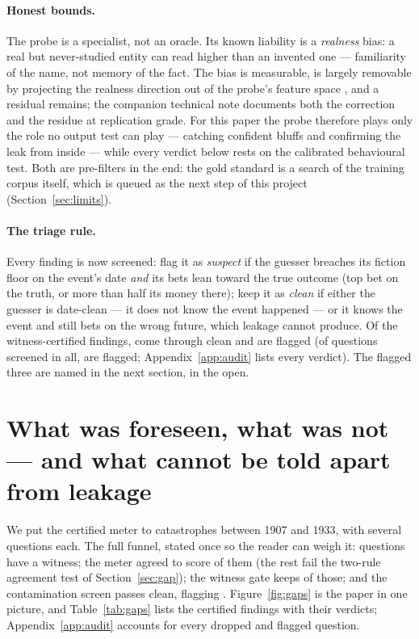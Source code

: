 \documentclass[11pt]{article}
\begin{document}
\paragraph{Honest bounds.} The probe is a specialist, not an oracle. Its known liability is a
\emph{realness} bias: a real but never-studied entity can read higher than an invented one --- familiarity
of the name, not memory of the fact. The bias is measurable, is largely removable by projecting the
realness direction out of the probe's feature space \citep{ravfogel2020}, and a residual remains; the
companion technical note documents both the correction and the residue at replication grade. For this
paper the probe therefore plays only the role no output test can play --- catching confident bluffs and
confirming the leak from inside --- while every verdict below rests on the calibrated behavioural test.
Both are pre-filters in the end: the gold standard is a search of the training corpus itself, which is
queued as the next step of this project (Section~\ref{sec:limits}).

\paragraph{The triage rule.} Every finding is now screened: flag it as \emph{suspect} if the guesser
breaches its fiction floor on the event's date \emph{and} its bets lean toward the true outcome (top bet
on the truth, or more than half its money there); keep it as \emph{clean} if either the guesser is
date-clean --- it does not know the event happened --- or it knows the event and still bets on the wrong
future, which leakage cannot produce. Of the \NgatePassed{} witness-certified findings,
\NgatedSafe{} come through clean and \NgatedSuspect{} are flagged (of \NtriageItems{} questions screened
in all, \NtriageSuspect{} are flagged; Appendix~\ref{app:audit} lists every verdict). The flagged three
are named in the next section, in the open.

\section{What was foreseen, what was not --- and what cannot be told apart from leakage}\label{sec:results}

We put the certified meter to \NnEvents{} catastrophes between 1907 and 1933, with several questions each.
The full funnel, stated once so the reader can weigh it: \NnMeasured{} questions have a witness; the meter
agreed to score \NnCovered{} of them (the rest fail the two-rule agreement test of Section~\ref{sec:gap});
the witness gate keeps \NgatePassed{} of those; and the contamination screen passes \NgatedSafe{} clean,
flagging \NgatedSuspect{}. Figure~\ref{fig:gaps} is the paper in one picture, and Table~\ref{tab:gaps}
lists the certified findings with their verdicts; Appendix~\ref{app:audit} accounts for every dropped and
flagged question.
\end{document}
